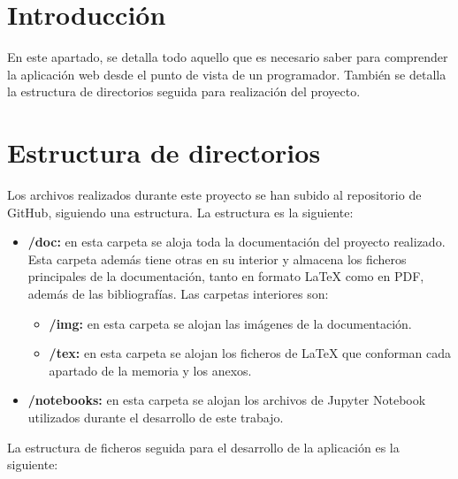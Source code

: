 
\section{Introducción}
En este apartado, se detalla todo aquello que es necesario saber para comprender la aplicación web desde el punto de vista de un programador. También se detalla la estructura de directorios seguida para realización del proyecto.

\section{Estructura de directorios}
Los archivos realizados durante este proyecto se han subido al repositorio de GitHub, siguiendo una estructura. La estructura es la siguiente:

\begin{itemize}
	\item \textbf{/doc:} en esta carpeta se aloja toda la documentación del proyecto realizado. Esta carpeta además tiene otras en su interior y almacena los ficheros principales de la documentación, tanto en formato \LaTeX{} como en PDF, además de las bibliografías. Las carpetas interiores son:
		\begin{itemize}
			\item \textbf{/img:} en esta carpeta se alojan las imágenes de la documentación.
			\item \textbf{/tex:} en esta carpeta se alojan los ficheros de \LaTeX{} que conforman cada apartado de la memoria y los anexos.
		\end{itemize}
	\item \textbf{/notebooks:} en esta carpeta se alojan los archivos de Jupyter Notebook utilizados durante el desarrollo de este trabajo.
\end{itemize}

La estructura de ficheros seguida para el desarrollo de la aplicación es la siguiente:

